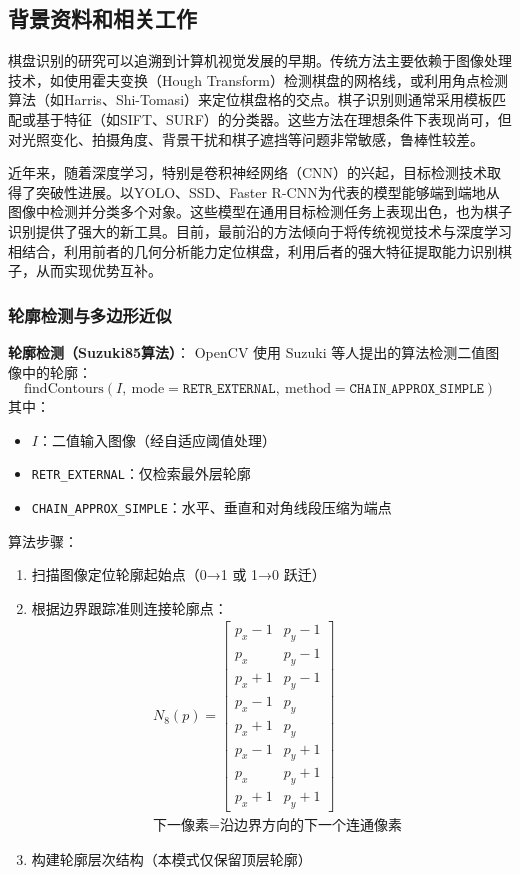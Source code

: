 \documentclass[12pt, a4paper]{article}
\begin{document}
\subsection{背景资料和相关工作}
棋盘识别的研究可以追溯到计算机视觉发展的早期。传统方法主要依赖于图像处理技术，如使用霍夫变换（Hough Transform）检测棋盘的网格线，或利用角点检测算法（如Harris、Shi-Tomasi）来定位棋盘格的交点。棋子识别则通常采用模板匹配或基于特征（如SIFT、SURF）的分类器。这些方法在理想条件下表现尚可，但对光照变化、拍摄角度、背景干扰和棋子遮挡等问题非常敏感，鲁棒性较差。

近年来，随着深度学习，特别是卷积神经网络（CNN）的兴起，目标检测技术取得了突破性进展。以YOLO、SSD、Faster R-CNN为代表的模型能够端到端地从图像中检测并分类多个对象。这些模型在通用目标检测任务上表现出色，也为棋子识别提供了强大的新工具。目前，最前沿的方法倾向于将传统视觉技术与深度学习相结合，利用前者的几何分析能力定位棋盘，利用后者的强大特征提取能力识别棋子，从而实现优势互补。
\subsubsection{轮廓检测与多边形近似}
\textbf{轮廓检测（Suzuki85算法）}：
OpenCV 使用 Suzuki 等人提出的算法检测二值图像中的轮廓：
\begin{equation}
\text{findContours}(I,\ \text{mode}=\texttt{RETR\_EXTERNAL},\ \text{method}=\texttt{CHAIN\_APPROX\_SIMPLE})
\end{equation}
其中：
\begin{itemize}
  \item $I$：二值输入图像（经自适应阈值处理）
  \item \texttt{RETR\_EXTERNAL}：仅检索最外层轮廓
  \item \texttt{CHAIN\_APPROX\_SIMPLE}：水平、垂直和对角线段压缩为端点
\end{itemize}
算法步骤：
\begin{enumerate}
  \item 扫描图像定位轮廓起始点（0→1 或 1→0 跃迁）
  \item 根据边界跟踪准则连接轮廓点：
    \begin{align*}
    &N_8(p) = \begin{bmatrix} 
      p_x-1 & p_y-1 \\ 
      p_x   & p_y-1 \\ 
      p_x+1 & p_y-1 \\ 
      p_x-1 & p_y   \\
      p_x+1 & p_y   \\
      p_x-1 & p_y+1 \\
      p_x   & p_y+1 \\
      p_x+1 & p_y+1 
    \end{bmatrix} \\
    &\text{下一像素} = \text{沿边界方向的下一个连通像素}
    \end{align*}
  \item 构建轮廓层次结构（本模式仅保留顶层轮廓）
\end{enumerate}
\end{document}
